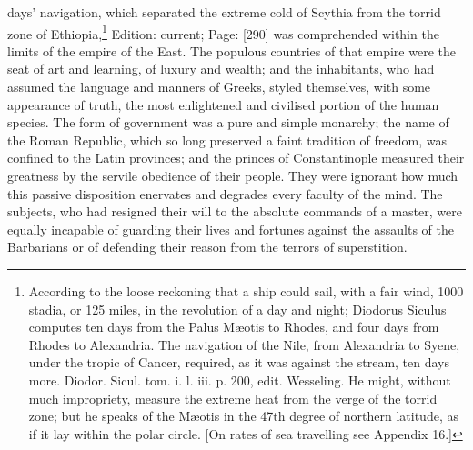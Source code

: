 days\texthebrew{}’ navigation, which separated the extreme cold of Scythia from the torrid zone of Ethiopia,\footnote{According to the loose reckoning that a ship could sail, with a fair wind, 1000 stadia, or 125 miles, in the revolution of a day and night; Diodorus Siculus computes ten days from the Palus Mæotis to Rhodes, and four days from Rhodes to Alexandria. The navigation of the Nile, from Alexandria to Syene, under the tropic of Cancer, required, as it was against the stream, ten days more. Diodor. Sicul. tom. i. l. iii. p. 200, edit. Wesseling. He might, without much impropriety, measure the extreme heat from the verge of the torrid zone; but he speaks of the Mæotis in the 47th degree of northern latitude, as if it lay within the polar circle. [On rates of sea travelling see Appendix 16.]} Edition: current; Page: [290] was comprehended within the limits of the empire of the East. The populous countries of that empire were the seat of art and learning, of luxury and wealth; and the inhabitants, who had assumed the language and manners of Greeks, styled themselves, with some appearance of truth, the most enlightened and civilised portion of the human species. The form of government was a pure and simple monarchy; the name of the Roman Republic, which so long preserved a faint tradition of freedom, was confined to the Latin provinces; and the princes of Constantinople measured their greatness by the servile obedience of their people. They were ignorant how much this passive disposition enervates and degrades every faculty of the mind. The subjects, who had resigned their will to the absolute commands of a master, were equally incapable of guarding their lives and fortunes against the assaults of the Barbarians or of defending their reason from the terrors of superstition.

